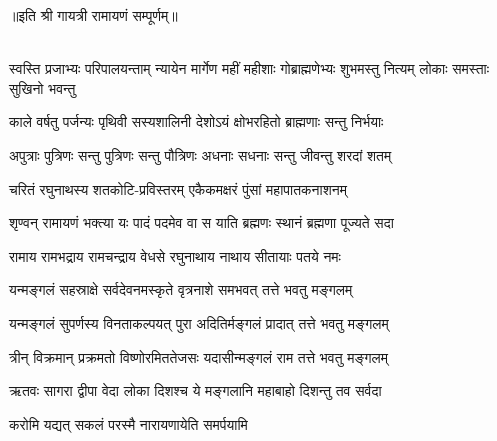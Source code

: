 ॥इति श्री गायत्री रामायणं सम्पूर्णम्॥

\mbox{}\\
\resetShloka
{}
\fourlineindentedshloka
{स्वस्ति प्रजाभ्यः परिपालयन्ताम्}
{न्यायेन मार्गेण महीं महीशाः}
{गोब्राह्मणेभ्यः शुभमस्तु नित्यम्}
{लोकाः समस्ताः सुखिनो भवन्तु}

\twolineshloka
{काले वर्षतु पर्जन्यः पृथिवी सस्यशालिनी}
{देशोऽयं क्षोभरहितो ब्राह्मणाः सन्तु निर्भयाः}

\twolineshloka
{अपुत्राः पुत्रिणः सन्तु पुत्रिणः सन्तु पौत्रिणः}
{अधनाः सधनाः सन्तु जीवन्तु शरदां शतम्}

\twolineshloka
{चरितं रघुनाथस्य शतकोटि-प्रविस्तरम्}
{एकैकमक्षरं पुंसां महापातकनाशनम्}

\twolineshloka
{शृण्वन् रामायणं भक्त्या यः पादं पदमेव वा}
{स याति ब्रह्मणः स्थानं ब्रह्मणा पूज्यते सदा}

\twolineshloka
{रामाय रामभद्राय रामचन्द्राय वेधसे}
{रघुनाथाय नाथाय सीतायाः पतये नमः}

\twolineshloka
{यन्मङ्गलं सहस्राक्षे सर्वदेवनमस्कृते}
{वृत्रनाशे समभवत् तत्ते भवतु मङ्गलम्}

\twolineshloka
{यन्मङ्गलं सुपर्णस्य विनताकल्पयत् पुरा}
{अदितिर्मङ्गलं प्रादात् तत्ते भवतु मङ्गलम्}

\twolineshloka
{त्रीन् विक्रमान् प्रक्रमतो विष्णोरमिततेजसः}
{यदासीन्मङ्गलं राम तत्ते भवतु मङ्गलम्}

\twolineshloka
{ऋतवः सागरा द्वीपा वेदा लोका दिशश्च ये}
{मङ्गलानि महाबाहो दिशन्तु तव सर्वदा}

{करोमि यद्यत् सकलं परस्मै नारायणायेति समर्पयामि}

